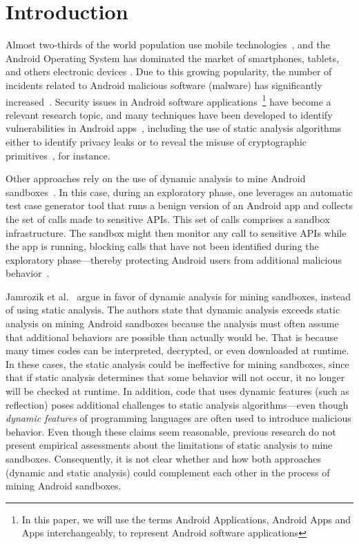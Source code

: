 \section{Introduction}\label{sec:introduction}

Almost two-thirds of the world population use mobile technologies~\cite{Comscore}, and the Android Operating System has dominated the market of smartphones, tablets, and others electronic devices \cite{statcounter}. Due to this growing popularity, the number of incidents related to Android malicious software (malware) has significantly increased~\cite{DBLP:journals/comsur/FarukiBLGGCR15,DBLP:journals/csur/SufatrioTCT15}. Security issues in Android software applications~\footnote{In this paper, we will use the terms Android Applications, Android Apps and Apps interchangeably, to represent Android software applications} have become a relevant research topic, and many techniques have been developed to identify vulnerabilities in Android apps~\cite{DBLP:conf/pldi/ArztRFBBKTOM14}, including the use of static analysis algorithms either to identify privacy leaks or to reveal the misuse of cryptographic primitives~\cite{krueger:ecoop-2018,rahaman:ccs-2019}, for instance.

Other approaches rely on the use of dynamic analysis to mine Android sandboxes~\cite{DBLP:conf/icse/JamrozikSZ16}. In this case, during an exploratory phase, one leverages an automatic test case generator tool that runs a benign version of an Android app and collects the set of calls made to sensitive APIs. This set of calls comprises a sandbox infrastructure. The sandbox might then monitor any call to sensitive APIs while the app is running, blocking calls that have not been identified during the exploratory phase---thereby protecting Android users from additional malicious behavior~\cite{DBLP:conf/icse/JamrozikSZ16}.

Jamrozik et al.~\cite{DBLP:conf/icse/JamrozikSZ16} argue in favor of dynamic analysis for mining sandboxes, instead of using static analysis.
The authors state that dynamic analysis exceeds static analysis on mining Android sandboxes because the analysis must often
assume that additional behaviors are possible than actually would be. That is because many times codes can be interpreted, decrypted, or even downloaded at runtime. In these cases, the static analysis could be ineffective for mining sandboxes, since that if static analysis determines that some behavior will not occur, it no longer will be checked at runtime. In addition, code that uses dynamic features (such as reflection) poses additional challenges to static analysis algorithms---even though \emph{dynamic features} of programming languages are often used to introduce malicious behavior. Even though these claims seem reasonable, previous research do not present empirical assessments about the limitations of static analysis to mine sandboxes. Consequently, it is not clear whether and how both approaches (dynamic and static analysis) could complement each other in the process of mining Android sandboxes.

